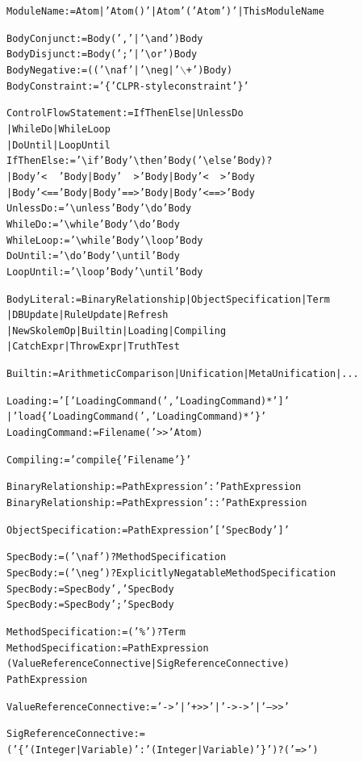 \documentclass[11pt]{article}
\newcommand{\bs}{\textbackslash}
\newcommand{\RULELOGNAF}{{\texttt{{\bs}naf}}\xspace}
\newcommand{\RULELOGNEG}{{\texttt{{\bs}neg}}\xspace}
\begin{document}
{\begin{alltt}
ModuleName := Atom | 'Atom()' | Atom '(' Atom ')' | ThisModuleName

BodyConjunct := Body (',' | '\bs{}and') Body
BodyDisjunct := Body (';' | '\bs{}or') Body
BodyNegative := (('\RULELOGNAF' | '\RULELOGNEG | '\ensuremath{\backslash}+') Body)
BodyConstraint := '\{' CLPR-style constraint '\}'

ControlFlowStatement  := IfThenElse | UnlessDo
                          | WhileDo | WhileLoop
                          | DoUntil | LoopUntil
IfThenElse := '\bs{}if' Body '\bs{}then' Body  ('\bs{}else' Body)?
                | Body '<~~' Body | Body '~~>' Body | Body '<~~>' Body
                | Body '<==' Body | Body '==>' Body | Body '<==>' Body
UnlessDo   := '\bs{}unless' Body '\bs{}do' Body
WhileDo    := '\bs{}while' Body '\bs{}do' Body
WhileLoop  := '\bs{}while' Body '\bs{}loop' Body
DoUntil    := '\bs{}do' Body '\bs{}until' Body
LoopUntil  := '\bs{}loop' Body '\bs{}until' Body

BodyLiteral := BinaryRelationship | ObjectSpecification | Term
                | DBUpdate | RuleUpdate | Refresh
                | NewSkolemOp | Builtin | Loading | Compiling
                | CatchExpr | ThrowExpr | TruthTest

Builtin := ArithmeticComparison | Unification | MetaUnification | ...

Loading := '[' LoadingCommand (',' LoadingCommand)* ']'
           | 'load\{' LoadingCommand (',' LoadingCommand)* '\}'
LoadingCommand := Filename ('>>' Atom)

Compiling := 'compile\{' Filename '\}'

BinaryRelationship := PathExpression ':' PathExpression
BinaryRelationship := PathExpression '::' PathExpression

ObjectSpecification := PathExpression '[' SpecBody ']'

SpecBody := ('\RULELOGNAF')? MethodSpecification
SpecBody := ('\RULELOGNEG')? ExplicitlyNegatableMethodSpecification
SpecBody := SpecBody ',' SpecBody
SpecBody := SpecBody ';' SpecBody

MethodSpecification :=  ('\%')? Term
MethodSpecification :=  PathExpression
                        (ValueReferenceConnective | SigReferenceConnective)
                        PathExpression

ValueReferenceConnective :=  '->' | '+>>' | '->->' | '-->>'

SigReferenceConnective := ('\{' (Integer|Variable) ':' (Integer|Variable) '\}')? ('=>')


\end{alltt}}
\end{document}
